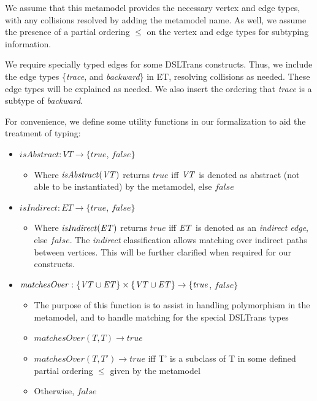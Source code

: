 We assume that this metamodel provides the necessary vertex and edge types, with any collisions resolved by adding the metamodel name. As well, we assume the presence of a partial ordering $\leq$ on the vertex and edge types for subtyping information.

We require specially typed edges for some DSLTrans constructs. Thus, we include the edge types \{\textit{trace}, and \textit{backward}\} in ET, resolving collisions as needed. These edge types will be explained as needed. We also insert the ordering that \textit{trace} is a subtype of \textit{backward}.

For convenience, we define some utility functions in our formalization to aid the treatment of typing:

\begin{itemize}
\item $\mathit{isAbstract}: \mathit{VT} \rightarrow \{\mathit{true}$, $\mathit{false}\}$
\begin{itemize}
\item Where $\mathit{isAbstract}(\mathit{VT})$ returns $\mathit{true}$ iff $\mathit{VT}$ is denoted as abstract (not able to be instantiated) by the metamodel, else $\mathit{false}$
\end{itemize}

\item $\mathit{isIndirect}: \mathit{ET} \rightarrow \{\mathit{true}$, $\mathit{false}\}$
\begin{itemize}
\item Where $\mathit{isIndirect}(\mathit{ET})$ returns $\mathit{true}$ iff $\mathit{ET}$ is denoted as an \textit{indirect edge}, else $\mathit{false}$. The \textit{indirect} classification allows matching over indirect paths between vertices. This will be further clarified when required for our constructs.
\end{itemize}

\item $\mathit{matchesOver}: \{\mathit{VT} \cup \mathit{ET}\} \times \{\mathit{VT} \cup \mathit{ET}\} \rightarrow \{\mathit{true}$, $\mathit{false}\}$

\begin{itemize}
\item The purpose of this function is to assist in handling polymorphism in the metamodel, and to handle matching for the special DSLTrans types
\item $\mathit{matchesOver}(T, T) \rightarrow \mathit{true}$
\item $\mathit{matchesOver}(T, T') \rightarrow \mathit{true}$ iff T' is a subclass of T in some defined partial ordering $\leq$ given by the metamodel
\item Otherwise, $\mathit{false}$
\end{itemize}
\end{itemize}

